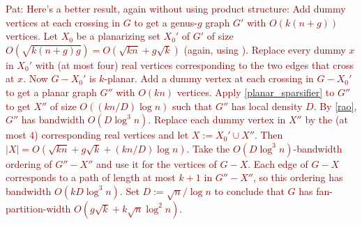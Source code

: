 \documentclass{patmorin}
\newcommand{\david}[1]{{\color{orange} David: #1}}
\newcommand{\pat}[1]{\textcolor{Maroon}{Pat: #1}}
\DeclareMathOperator{\tw}{tw}
\begin{document}
\pat{Here's a better result, again without using product structure:  Add dummy vertices at each crossing in $G$ to get a genus-$g$ graph $G'$ with $O(k(n+g))$ vertices.  Let $X_0$ be a planarizing set $X_0'$ of $G'$ of size $O(\sqrt{k(n+g)g})=O(\sqrt{kn}+g\sqrt{k})$ (again, using \citet{eppstein:dynamic}). Replace every dummy $x$ in $X_0'$ with (at most four) real vertices corresponding to the two edges that cross at $x$.  Now $G-X_0'$ is $k$-planar.  Add a dummy vertex at each crossing in $G-X_0'$ to get a planar graph $G''$ with $O(kn)$ vertices. Apply \cref{planar_sparsifier} to $G''$ to get $X''$ of size $O((kn/D)\log n)$ such that $G''$ has local density $D$.  By \cref{rao}, $G''$ has bandwidth $O(D\log^3 n)$.  Replace each dummy vertex in $X''$ by the (at most $4$) corresponding real vertices and let $X:=X_0'\cup X''$.  Then $|X|=O(\sqrt{kn}+g\sqrt{k}+(kn/D)\log n)$.  Take the $O(D\log^3 n)$-bandwidth ordering of $G''-X''$ and use it for the vertices of $G-X$.  Each edge of $G-X$ corresponds to a path of length at most $k+1$ in $G''-X''$, so this ordering has bandwidth $O(kD\log^3 n)$.  Set $D:=\sqrt{n}/\log n$ to conclude that $G$ has fan-partition-width $O(g\sqrt{k} + k\sqrt{n}\log^2 n)$.}

\end{document}
